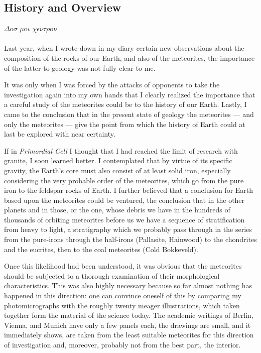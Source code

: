 \documentclass[a4paper, 12pt, oneside]{article}
\begin{document}
\subsection{History and Overview}
$\Delta$o$\sigma$ $\mu$o$\iota$ $\chi\epsilon\nu\tau\rho$o$\nu$%
\paragraph{}
Last year, when I wrote-down in my diary certain new observations about the composition of the rocks of our Earth, and also of the meteorites, the importance of the latter to geology was not fully clear to me.

It was only when I was forced by the attacks of opponents to take the investigation again into my own hands that I clearly realized the importance that a careful study of the meteorites could be to the history of our Earth. Lastly, I came to the conclusion that in the present state of geology the meteorites --- and only the meteorites --- give the point from which the history of Earth could at last be explored with near certainty.

If in \emph{Primordial Cell} I thought that I had reached the limit of research with granite, I soon learned better. I contemplated that by virtue of its specific gravity, the Earth's core must also consist of at least solid iron, especially considering the very probable order of the meteorites, which go from the pure iron to the feldspar rocks of Earth. I further believed that a conclusion for Earth based upon the meteorites could be ventured, the conclusion that in the other planets and in those, or the one, whose debris we have in the hundreds of thousands of orbiting meteorites before us we have a sequence of stratification from heavy to light, a stratigraphy which we probably pass through in the series from the pure-irons through the half-irons (Pallasite, Hainwood) to the chondrites and the eucrites, then to the coal meteorites (Cold Bokkeveld).

Once this likelihood had been understood, it was obvious that the meteorites should be subjected to a thorough examination of their morphological characteristics. This was also highly necessary because so far almost nothing has happened in this direction: one can convince oneself of this by comparing my photomicrographs with the roughly twenty meager illustrations, which taken together form the material of the science today. The academic writings of Berlin, Vienna, and Munich have only a few panels each, the drawings are small, and it immediately shows, are taken from the least suitable meteorites for this direction of investigation and, moreover, probably not from the best part, the interior.
\end{document}
